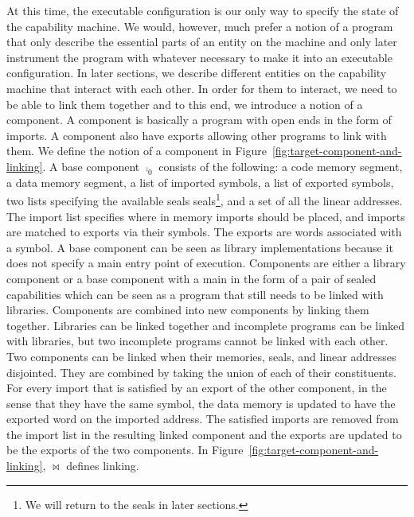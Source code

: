 \documentclass[acmsmall,review,anonymous]{acmart}\settopmatter{printfolios=true,printccs=false,printacmref=false}
\begin{document}
At this time, the executable configuration is our only way to specify the state of the capability machine.
We would, however, much prefer a notion of a program that only describe the essential parts of an entity on the machine and only later instrument the program with whatever necessary to make it into an executable configuration.
In later sections, we describe different entities on the capability machine that interact with each other.
In order for them to interact, we need to be able to link them together and to this end, we introduce a notion of a component.
A component is basically a program with open ends in the form of imports.
A component also have exports allowing other programs to link with them.
We define the notion of a component in Figure~\ref{fig:target-component-and-linking}.
A base component $\comp_0$ consists of the following: a code memory segment, a data memory segment, a list of imported symbols, a list of exported symbols, two lists specifying the available seals seals\footnote{We will return to the seals in later sections.}, and a set of all the linear addresses.
The import list specifies where in memory imports should be placed, and imports are matched to exports via their symbols.
The exports are words associated with a symbol.
A base component can be seen as library implementations because it does not specify a main entry point of execution.
Components are either a library component or a base component with a main in the form of a pair of sealed capabilities which can be seen as a program that still needs to be linked with libraries.
Components are combined into new components by linking them together.
Libraries can be linked together and incomplete programs can be linked with libraries, but two incomplete programs cannot be linked with each other.
Two components can be linked when their memories, seals, and linear addresses disjointed.
They are combined by taking the union of each of their constituents.
For every import that is satisfied by an export of the other component, in the sense that they have the same symbol, the data memory is updated to have the exported word on the imported address.
The satisfied imports are removed from the import list in the resulting linked component and the exports are updated to be the exports of the two components.
In Figure~\ref{fig:target-component-and-linking}, $\bowtie$ defines linking.
\end{document}
